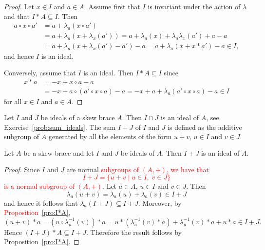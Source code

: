 \begin{proof}
    Let $x\in I$ and $a\in A$.  Assume first that $I$ is invariant under the
    action of $\lambda$ and that $I*A\subseteq I$. Then
    \begin{equation}
    \label{eq:trick:I*A}
        \begin{aligned}
        a\circ x\circ a' &=a+\lambda_a(x\circ a')\\
        &=a+\lambda_a(x+\lambda_x(a'))
        =a+\lambda_a(x)+\lambda_a\lambda_x(a')+a-a\\
        &=a+\lambda_a(x+\lambda_x(a')-a')-a
        =a+\lambda_a(x+x*a')-a\in I,
    \end{aligned}
    \end{equation}
    and hence $I$ is an ideal.

    Conversely, assume that $I$ is an ideal. Then $I*A\subseteq I$ since
    \begin{align*}
        x*a&=-x+x\circ a-a\\
        &=-x+a\circ(a'\circ x\circ a)-a
        =-x+a+\lambda_a(a'\circ x\circ a)-a\in I
    \end{align*}
   for all $x\in I$ and $a\in A$.
\end{proof}


Let $I$ and $J$ be ideals
of a skew brace $A$. Then $I\cap J$ is an ideal of $A$, see Exercise~\ref{prob:sum_ideals}.  
The sum $I+J$ of $I$ and $J$ is defined as the
additive subgroup of $A$ generated by all the 
elements of the form
$u+v$, $u\in I$ and $v\in J$. 

\begin{proposition}
Let $A$ be a skew brace and let
$I$ and $J$ be ideals of $A$. Then $I+J$ is an ideal of $A$.
\end{proposition}

\begin{proof}
    Since $I$ and $J$ are normal \textcolor{red}{subgroups of $(A,+)$, we have that
    \[ I+J=\{ u+v \mid u\in I,\; v\in J \}\]
    is a normal subgroup of $(A,+)$.}
    Let $a\in A$, $u\in I$ and $v\in J$. Then 
    \[
    \lambda_a(u+v)=\lambda_a(u)+\lambda_a(v)\in I+J
    \]
    and
    hence it follows that $\lambda_a(I+J)\subseteq I+J$. Moreover, by \textcolor{red}{Proposition~\ref{pro:I*A}},
        \[
        (u+v)*a=(u\circ\lambda^{-1}_u(v))*a
        =u*(\lambda^{-1}_u(v)*a)+\lambda^{-1}_u(v)*a+u*a\in I+J.
    \]
    Hence $(I+J)*A\subseteq I+J$. Therefore the result follows by Proposition~\ref{pro:I*A}.
\end{proof}


